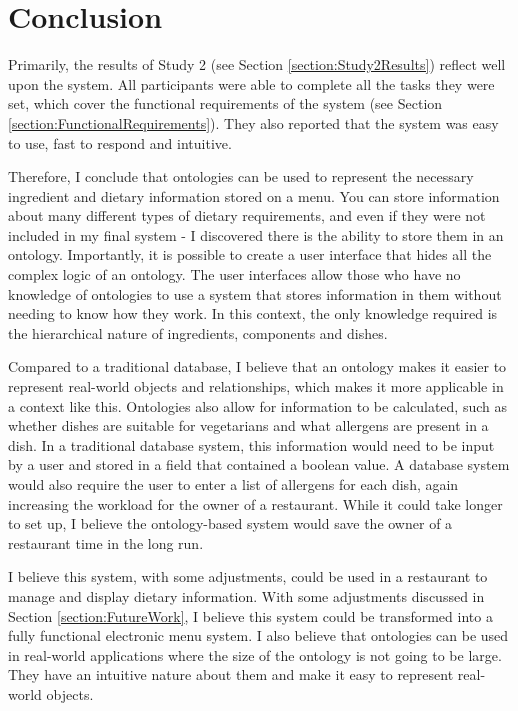 \section{Conclusion}

Primarily, the results of Study 2 (see Section \ref{section:Study2Results}) reflect well upon the system. All participants were able to complete all the tasks they were set, which cover the functional requirements of the system (see Section \ref{section:FunctionalRequirements}). They also reported that the system was easy to use, fast to respond and intuitive.

Therefore, I conclude that ontologies can be used to represent the necessary ingredient and dietary information stored on a menu. You can store information about many different types of dietary requirements, and even if they were not included in my final system - I discovered there is the ability to store them in an ontology. Importantly, it is possible to create a user interface that hides all the complex logic of an ontology. The user interfaces allow those who have no knowledge of ontologies to use a system that stores information in them without needing to know how they work. In this context, the only knowledge required is the hierarchical nature of ingredients, components and dishes.

Compared to a traditional database, I believe that an ontology makes it easier to represent real-world objects and relationships, which makes it more applicable in a context like this. Ontologies also allow for information to be calculated, such as whether dishes are suitable for vegetarians and what allergens are present in a dish. In a traditional database system, this information would need to be input by a user and stored in a field that contained a boolean value. A database system would also require the user to enter a list of allergens for each dish, again increasing the workload for the owner of a restaurant. While it could take longer to set up, I believe the ontology-based system would save the owner of a restaurant time in the long run.

I believe this system, with some adjustments, could be used in a restaurant to manage and display dietary information. With some adjustments discussed in Section \ref{section:FutureWork}, I believe this system could be transformed into a fully functional electronic menu system. I also believe that ontologies can be used in real-world applications where the size of the ontology is not going to be large. They have an intuitive nature about them and make it easy to represent real-world objects.

